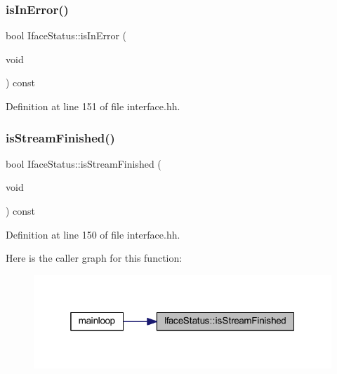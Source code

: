 \subsubsection{\texorpdfstring{isInError()}{isInError()}}
{\footnotesize\ttfamily bool Iface\+Status\+::is\+In\+Error (\begin{DoxyParamCaption}\item[{void}]{ }\end{DoxyParamCaption}) const\hspace{0.3cm}{\ttfamily [inline]}}



Definition at line 151 of file interface.\+hh.

\mbox{\label{class_iface_status_a916d4d648e2ddacd874c568d01c42763}} 
\subsubsection{\texorpdfstring{isStreamFinished()}{isStreamFinished()}}
{\footnotesize\ttfamily bool Iface\+Status\+::is\+Stream\+Finished (\begin{DoxyParamCaption}\item[{void}]{ }\end{DoxyParamCaption}) const\hspace{0.3cm}{\ttfamily [inline]}}



Definition at line 150 of file interface.\+hh.

Here is the caller graph for this function\+:
\nopagebreak
\begin{figure}[H]
\begin{center}
\leavevmode
\includegraphics[width=319pt]{class_iface_status_a916d4d648e2ddacd874c568d01c42763_icgraph}
\end{center}
\end{figure}
\mbox{\label{class_iface_status_a8091c5bf341cfb11997893f0a35ba516}} 
